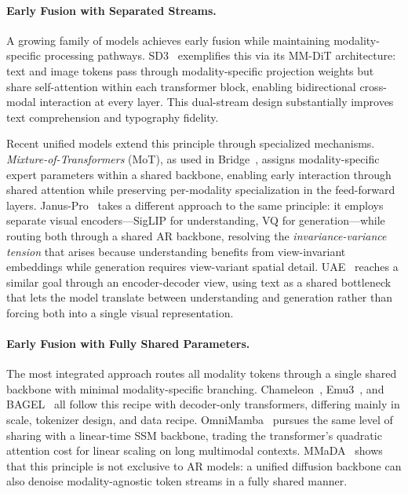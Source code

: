 \documentclass{llmxive}
\begin{document}
\paragraph{Early Fusion with Separated Streams.}
A growing family of models achieves early fusion while maintaining modality-specific processing pathways. SD3~\citep{esser2024stablediffusion3} exemplifies this via its MM-DiT architecture: text and image tokens pass through modality-specific projection weights but share self-attention within each transformer block, enabling bidirectional cross-modal interaction at every layer. This dual-stream design substantially improves text comprehension and typography fidelity.

Recent unified models extend this principle through specialized mechanisms. \emph{Mixture-of-Transformers} (MoT), as used in Bridge~\citep{wang2025bridge}, assigns modality-specific expert parameters within a shared backbone, enabling early interaction through shared attention while preserving per-modality specialization in the feed-forward layers. Janus-Pro~\citep{chen2025janusprounifiedmultimodalunderstanding} takes a different approach to the same principle: it employs separate visual encoders---SigLIP for understanding, VQ for generation---while routing both through a shared AR backbone, resolving the \emph{invariance-variance tension} that arises because understanding benefits from view-invariant embeddings while generation requires view-variant spatial detail. UAE~\citep{yan2025uae} reaches a similar goal through an encoder-decoder view, using text as a shared bottleneck that lets the model translate between understanding and generation rather than forcing both into a single visual representation.

\paragraph{Early Fusion with Fully Shared Parameters.}
The most integrated approach routes all modality tokens through a single shared backbone with minimal modality-specific branching. Chameleon~\citep{chameleon2024}, Emu3~\citep{wang2024emu3}, and BAGEL~\citep{deng2025bagelemerging} all follow this recipe with decoder-only transformers, differing mainly in scale, tokenizer design, and data recipe. OmniMamba~\citep{zou2025omnimamba} pursues the same level of sharing with a linear-time SSM backbone, trading the transformer's quadratic attention cost for linear scaling on long multimodal contexts. MMaDA~\citep{yang2025mmada} shows that this principle is not exclusive to AR models: a unified diffusion backbone can also denoise modality-agnostic token streams in a fully shared manner.
\end{document}
